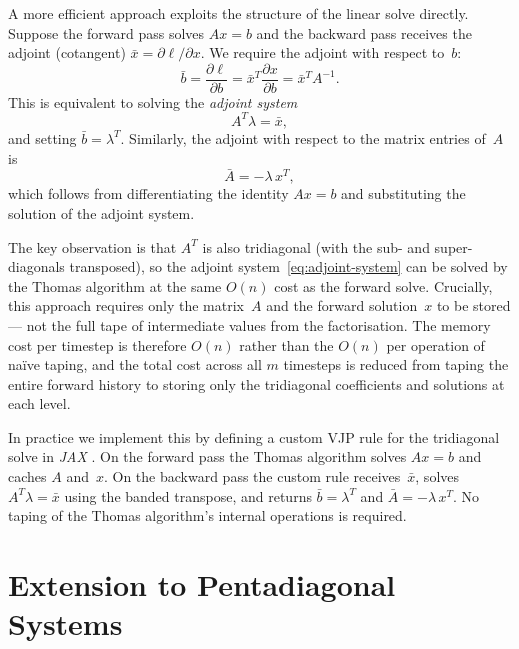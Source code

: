 A more efficient approach exploits the structure of the linear solve
directly. Suppose the forward pass solves $Ax = b$ and the backward pass
receives the adjoint (cotangent) $\bar{x} = \partial \ell / \partial x$.
We require the adjoint with respect to~$b$:
\begin{equation}
  \bar{b} = \frac{\partial \ell}{\partial b}
  = \bar{x}^T \frac{\partial x}{\partial b}
  = \bar{x}^T A^{-1}.
  \label{eq:adjoint-b}
\end{equation}
This is equivalent to solving the \emph{adjoint system}
\begin{equation}
  A^T \lambda = \bar{x},
  \label{eq:adjoint-system}
\end{equation}
and setting $\bar{b} = \lambda^T$. Similarly, the adjoint with respect to
the matrix entries of~$A$ is
\begin{equation}
  \bar{A} = -\lambda\, x^T,
  \label{eq:adjoint-A}
\end{equation}
which follows from differentiating the identity $A x = b$ and
substituting the solution of the adjoint system.

The key observation is that $A^T$ is also tridiagonal (with the sub- and
super-diagonals transposed), so the adjoint system~\cref{eq:adjoint-system}
can be solved by the Thomas algorithm at the same $O(n)$ cost as the
forward solve. Crucially, this approach requires only the matrix~$A$ and
the forward solution~$x$ to be stored --- not the full tape of
intermediate values from the factorisation. The memory cost per timestep
is therefore $O(n)$ rather than the $O(n)$ per operation of na\"ive
taping, and the total cost across all $m$ timesteps is reduced from
taping the entire forward history to storing only the tridiagonal
coefficients and solutions at each level.

In practice we implement this by defining a custom VJP rule for the
tridiagonal solve in \emph{JAX} \cite{jax2018github}. On the forward
pass the Thomas algorithm solves
$Ax = b$ and caches $A$ and~$x$. On the backward pass the custom rule
receives~$\bar{x}$, solves $A^T \lambda = \bar{x}$ using the banded
transpose, and returns $\bar{b} = \lambda^T$ and
$\bar{A} = -\lambda\, x^T$. No taping of the Thomas algorithm's internal
operations is required.

\section{Extension to Pentadiagonal Systems}\label{sec:pentadiagonal}


